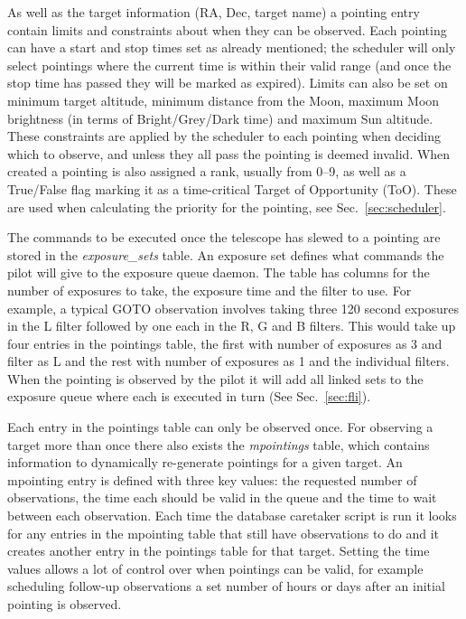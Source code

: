 \begin{colsection}
\begin{colsection}
As well as the target information (RA, Dec, target name) a pointing entry contain limits and constraints about when they can be observed. Each pointing can have a start and stop times set as already mentioned; the scheduler will only select pointings where the current time is within their valid range (and once the stop time has passed they will be marked as expired). Limits can also be set on minimum target altitude, minimum distance from the Moon, maximum Moon brightness (in terms of Bright/Grey/Dark time) and maximum Sun altitude. These constraints are applied by the scheduler to each pointing when deciding which to observe, and unless they all pass the pointing is deemed invalid. When created a pointing is also assigned a rank, usually from 0--9, as well as a True/False flag marking it as a time-critical Target of Opportunity (ToO). These are used when calculating the priority for the pointing, see Sec.~\ref{sec:scheduler}.

The commands to be executed once the telescope has slewed to a pointing are stored in the \textit{exposure\_sets} table. An exposure set defines what commands the pilot will give to the exposure queue daemon. The table has columns for the number of exposures to take, the exposure time and the filter to use. For example, a typical GOTO observation involves taking three 120 second exposures in the L filter followed by one each in the R, G and B filters. This would take up four entries in the pointings table, the first with number of exposures as 3 and filter as L and the rest with number of exposures as 1 and the individual filters. When the pointing is observed by the pilot it will add all linked sets to the exposure queue where each is executed in turn (See Sec.~\ref{sec:fli}).

Each entry in the pointings table can only be observed once. For observing a target more than once there also exists the \textit{mpointings} table, which contains information to dynamically re-generate pointings for a given target. An mpointing entry is defined with three key values: the requested number of observations, the time each should be valid in the queue and the time to wait between each observation. Each time the database caretaker script is run it looks for any entries in the mpointing table that still have observations to do and it creates another entry in the pointings table for that target. Setting the time values allows a lot of control over when pointings can be valid, for example scheduling follow-up observations a set number of hours or days after an initial pointing is observed.


\end{colsection}
\end{colsection}
